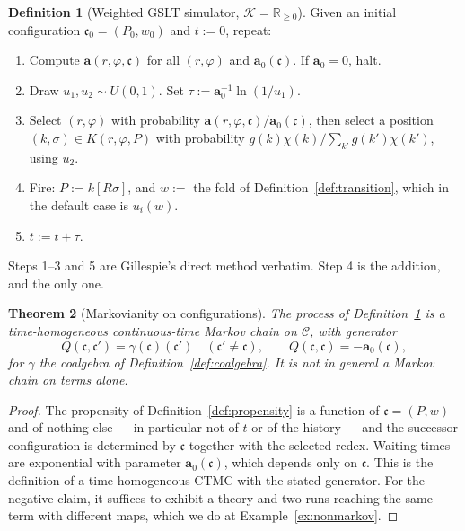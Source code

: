 \documentclass[11pt,a4paper]{article}
\theoremstyle{plain}
\newtheorem{theorem}{Theorem}
\theoremstyle{definition}
\newtheorem{definition}[theorem]{Definition}
\theoremstyle{remark}
\newcommand{\Rnn}{\mathbb{R}_{\geq 0}}
\newcommand{\Cfg}{\mathcal{C}}
\newcommand{\prop}{\mathbf{a}}
\newcommand{\wmap}{w}
\newcommand{\gfac}{g}
\begin{document}
\begin{definition}[Weighted GSLT simulator, $\mathcal{K} = \Rnn$]
\label{def:ssa}
Given an initial configuration $\mathfrak{c}_0 = (P_0, \wmap_0)$ and $t := 0$, repeat:
\begin{enumerate}[leftmargin=2.2em]
\item Compute $\prop(r,\varphi,\mathfrak{c})$ for all $(r,\varphi)$ and $\prop_0(\mathfrak{c})$. If
$\prop_0 = 0$, halt.
\item Draw $u_1, u_2 \sim U(0,1)$. Set $\tau := \prop_0^{-1}\ln(1/u_1)$.
\item Select $(r,\varphi)$ with probability $\prop(r,\varphi,\mathfrak{c})/\prop_0(\mathfrak{c})$,
then select a position $(k,\sigma) \in K(r,\varphi,P)$ with probability
$\gfac(k)\chi(k)/\sum_{k'}\gfac(k')\chi(k')$, using $u_2$.
\item Fire: $P := k[R\sigma]$, and $\wmap := $ the fold of Definition~\ref{def:transition}, which in
the default case is $u_i(\wmap)$.
\item $t := t + \tau$.
\end{enumerate}
\end{definition}

Steps 1--3 and 5 are Gillespie's direct method \cite{gillespie77} verbatim. Step 4 is the addition,
and the only one.

\begin{theorem}[Markovianity on configurations]
\label{thm:markov}
The process of Definition~\ref{def:ssa} is a time-homogeneous continuous-time Markov chain on
$\Cfg$, with generator
\[
Q(\mathfrak{c}, \mathfrak{c}')
= \gamma(\mathfrak{c})(\mathfrak{c}')
\quad (\mathfrak{c}' \neq \mathfrak{c}),
\qquad
Q(\mathfrak{c},\mathfrak{c}) = -\prop_0(\mathfrak{c}),
\]
for $\gamma$ the coalgebra of Definition~\ref{def:coalgebra}. It is \emph{not} in general a Markov
chain on terms alone.
\end{theorem}

\begin{proof}
The propensity of Definition~\ref{def:propensity} is a function of $\mathfrak{c} = (P,\wmap)$ and of
nothing else --- in particular not of $t$ or of the history --- and the successor configuration is
determined by $\mathfrak{c}$ together with the selected redex. Waiting times are exponential with
parameter $\prop_0(\mathfrak{c})$, which depends only on $\mathfrak{c}$. This is the definition of a
time-homogeneous CTMC with the stated generator. For the negative claim, it suffices to exhibit a
theory and two runs reaching the same term with different maps, which we do at
Example~\ref{ex:nonmarkov}.
\end{proof}
\end{document}
